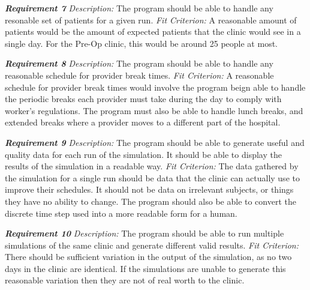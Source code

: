\documentclass[12pt, titlepage]{article}
\begin{document}
\noindent\textbf{\textit{Requirement 7}}\newline
\textit{Description:}\newline
The program should be able to handle any resonable set of patients for a given run.
\newline\newline
\textit{Fit Criterion:}\newline 
A reasonable amount of patients would be the amount of expected patients that the clinic would see in a single day. For the Pre-Op clinic, this would be around 25 people at most.  \newline

\noindent\textbf{\textit{Requirement 8}}\newline
\textit{Description:}\newline
The program should be able to handle any reasonable schedule for provider break times.
\newline\newline
\textit{Fit Criterion:}\newline 
A reasonable schedule for provider break times would involve the program beign able to handle the periodic breaks each provider must take during the day to comply with worker's regulations. The program must also be able to handle lunch breaks, and extended breaks where a provider moves to a different part of the hospital.  \newline

\noindent\textbf{\textit{Requirement 9}}\newline
\textit{Description:}\newline
The program should be able to generate useful and quality data for each run of the simulation. It should be able to display the results of the simulation in a readable way.
\newline\newline
\textit{Fit Criterion:}\newline 
The data gathered by the simulation for a single run should be data that the clinic can actually use to improve their schedules. It should not be data on irrelevant subjects, or things they have no ability to change. The program should also be able to convert the discrete time step used into a more readable form for a human. \newline

\noindent\textbf{\textit{Requirement 10}}\newline
\textit{Description:}\newline
The program should be able to run multiple simulations of the same clinic and generate different valid results.
\newline\newline
\textit{Fit Criterion:}\newline 
There should be sufficient variation in the output of the simulation, as no two days in the clinic are identical. If the simulations are unable to generate this reasonable variation then they are not of real worth to the clinic.  \newline
\end{document}

